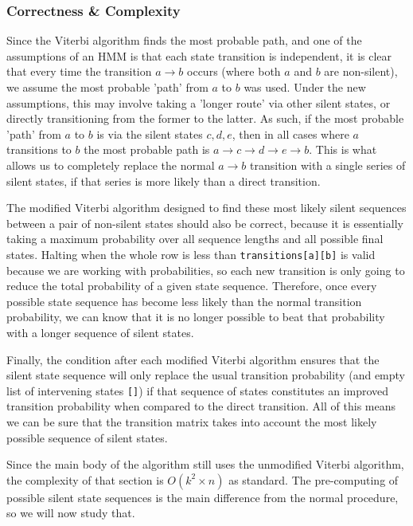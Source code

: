 \documentclass[11pt]{article} %
\begin{document}
\subsubsection{Correctness \& Complexity}
Since the Viterbi algorithm finds the most probable path, and one of the assumptions of an HMM is that each state transition is independent, it is clear that every time the transition $a \rightarrow b$ occurs (where both $a$ and $b$ are non-silent), we assume the most probable 'path' from $a$ to $b$ was used. Under the new assumptions, this may involve taking a 'longer route' via other silent states, or directly transitioning from the former to the latter. As such, if the most probable 'path' from $a$ to $b$ is via the silent states $c, d, e$, then in all cases where $a$ transitions to $b$ the most probable path is $a \rightarrow c \rightarrow d \rightarrow e \rightarrow b$. This is what allows us to completely replace the normal $a \rightarrow b$ transition with a single series of silent states, if that series is more likely than a direct transition.

The modified Viterbi algorithm designed to find these most likely silent sequences between a pair of non-silent states should also be correct, because it is essentially taking a maximum probability over all sequence lengths and all possible final states. Halting when the whole row is less than \texttt{transitions[a][b]} is valid because we are working with probabilities, so each new transition is only going to reduce the total probability of a given state sequence. Therefore, once every possible state sequence has become less likely than the normal transition probability, we can know that it is no longer possible to beat that probability with a longer sequence of silent states.

Finally, the condition after each modified Viterbi algorithm ensures that the silent state sequence will only replace the usual transition probability (and empty list of intervening states \texttt{[]}) if that sequence of states constitutes an improved transition probability when compared to the direct transition. All of this means we can be sure that the transition matrix takes into account the most likely possible sequence of silent states.

\hfill

Since the main body of the algorithm still uses the unmodified Viterbi algorithm, the complexity of that section is $O(k^2 \times n)$ as standard. The pre-computing of possible silent state sequences is the main difference from the normal procedure, so we will now study that.
\end{document}
